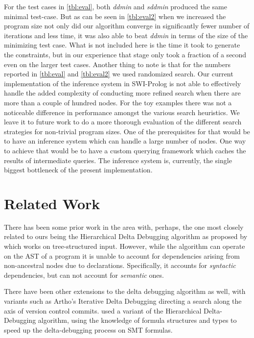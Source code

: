 \documentclass[preprint]{acm_proc_article-sp}
\begin{document}
For the test cases in \autoref{tbl:eval}, both \emph{ddmin} and \emph{sddmin}
produced the same minimal test-case. But as can be seen in \autoref{tbl:eval2}
when we increased the program size not only did our algorithm converge in
significantly fewer number of iterations and less time, it was also able to beat
\emph{ddmin} in terms of the size of the minimizing test case. What is not
included here is the time it took to generate the constraints, but in our
experience that stage only took a fraction of a second even on the larger test
cases. Another thing to note is that for the numbers reported in
\autoref{tbl:eval} and \autoref{tbl:eval2} we used randomized search. Our
current implementation of the inference system in SWI-Prolog is not able to
effectively handle the added complexity of conducting more refined search when
there are more than a couple of hundred nodes. For the toy examples there was
not a noticeable difference in performance amongst the various search
heuristics. We leave it to future work to do a more thorough evaluation of the
different search strategies for non-trivial program sizes. One of the
prerequisites for that would be to have an inference system which can handle a
large number of nodes. One way to achieve that would be to have a custom
querying framework which caches the results of intermediate queries. The
inference system is, currently, the single biggest bottleneck of the present
implementation.

\section{Related Work}



There has been some prior work in the area with, perhaps, the one most closely
related to ours being the Hierarchical Delta Debugging algorithm as proposed by
\citet{hdd} which works on tree-structured input. However, while the algorithm
can operate on the AST of a program it is unable to account for dependencies
arising from non-ancestral nodes due to declarations. Specifically, it accounts
for \emph{syntactic} dependencies, but can not account for \emph{semantic} ones.

There have been other extensions to the delta debugging algorithm as well, with
variants such as Artho's Iterative Delta Debugging \citep{idd} directing a search
along the axis of version control commits. \citet{smt} used a
variant of the Hierarchical Delta-Debugging algorithm, using the knowledge of
formula structures and types to speed up the delta-debugging process on SMT
formulas.
\end{document}
